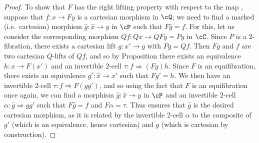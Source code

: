 \documentclass[11pt, dvipsnames]{amsart}
\begin{document}
\begin{proof}
			To show that $F$ has the right lifting property with respect to the map , suppose that $f\colon x\to Fy$  is a cartesian morphism in $\cQ$; we need to find a marked (i.e.\ cartesian) morphism $\widehat{g}\colon\widehat{x}\to y$ in $\cP$ such that $F\widehat{g}= f$. For this, let us consider the corresponding morphism $Qf\colon Qx \to QFy = Py$ in $\cC$. Since $P$ is a $2$-fibration, there exists a cartesian lift $g\colon x' \to y$ with $Pg = Qf$. Then $Fg$ and $f$ are two cartesian $Q$-lifts of $Qf$, and so by Proposition  there exists an equivalence $h\colon x \to F(x')$ and an invertible $2$-cell $\tau\colon f \Rightarrow (Fg)h$. Since $F$ is an equifibration, there exists an equivalence ${g'}\colon \widehat{x} \to x'$ such that $Fg'=h$. We then have an invertible $2$-cell $\tau\colon f \Rightarrow F(gg')$, and so using the fact that $F$ is an equifibration once again, we can find a morphism $\widehat{g}\colon \widehat{x} \to y$ in $\cP$ and an invertible $2$-cell $\alpha\colon \widehat{g}  \Rightarrow gg'$ such that $F\widehat{g} = f$ and $F\alpha = \tau$. Thus \cite[Proposition 3.1.8]{Buckley2014} ensures that $\widehat{g}$ is the desired cartesian morphism, as it is related by the invertible 2-cell $\alpha$ to the composite of $g'$ (which is an equivalence, hence cartesian) and $g$ (which is cartesian by construction).


\end{proof}
\end{document}
